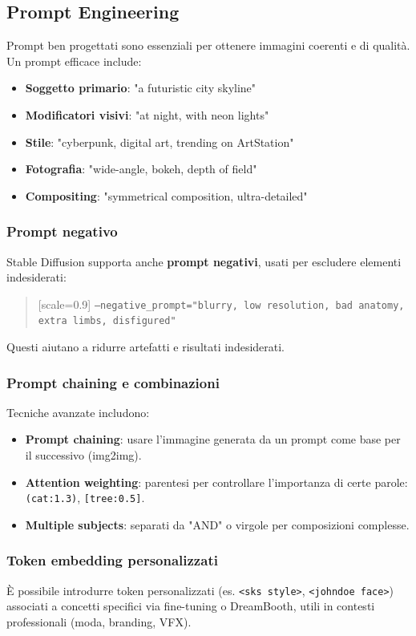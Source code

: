\subsection*{Prompt Engineering}

Prompt ben progettati sono essenziali per ottenere immagini coerenti e di qualità. Un prompt efficace include:

\begin{itemize}
    \item \textbf{Soggetto primario}: "a futuristic city skyline"
    \item \textbf{Modificatori visivi}: "at night, with neon lights"
    \item \textbf{Stile}: "cyberpunk, digital art, trending on ArtStation"
    \item \textbf{Fotografia}: "wide-angle, bokeh, depth of field"
    \item \textbf{Compositing}: "symmetrical composition, ultra-detailed"
\end{itemize}

\subsubsection*{Prompt negativo}

Stable Diffusion supporta anche \textbf{prompt negativi}, usati per escludere elementi indesiderati:

\begin{quote}[scale=0.9]
    \texttt{--negative\_prompt="blurry, low resolution, bad anatomy, extra limbs, disfigured"}
\end{quote}

Questi aiutano a ridurre artefatti e risultati indesiderati.

\subsubsection*{Prompt chaining e combinazioni}

Tecniche avanzate includono:
\begin{itemize}
    \item \textbf{Prompt chaining}: usare l’immagine generata da un prompt come base per il successivo (img2img).
    \item \textbf{Attention weighting}: parentesi per controllare l'importanza di certe parole: \texttt{(cat:1.3)}, \texttt{[tree:0.5]}.
    \item \textbf{Multiple subjects}: separati da "AND" o virgole per composizioni complesse.
\end{itemize}

\subsubsection*{Token embedding personalizzati}

È possibile introdurre token personalizzati (es. \texttt{<sks style>}, \texttt{<johndoe face>}) associati a concetti specifici via fine-tuning o DreamBooth, utili in contesti professionali (moda, branding, VFX).